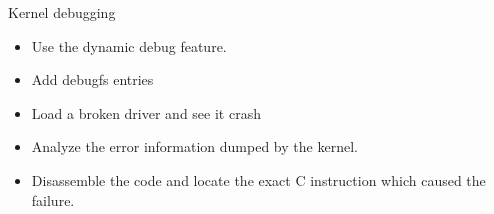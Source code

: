 \setuplabframe
{Kernel debugging}
{
  \begin{itemize}
  \item Use the dynamic debug feature.
  \item Add debugfs entries
  \item Load a broken driver and see it crash
  \item Analyze the error information dumped by the kernel.
  \item Disassemble the code and locate the exact C instruction which
    caused the failure.
  \end{itemize}
}
